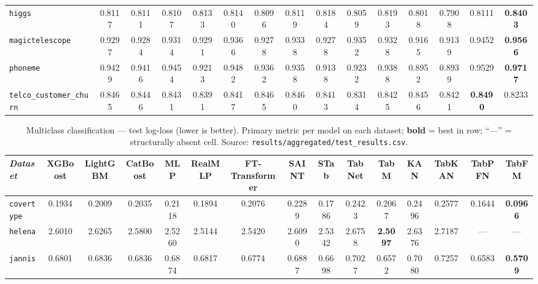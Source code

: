\begin{landscape}
\begin{table}[htbp]
\begin{tabular}{lcccccccccccccc}
\texttt{higgs} & 0.8117 & 0.8111 & 0.8107 & 0.8133 & 0.8140 & 0.8096 & 0.8119 & 0.8184 & 0.8059 & 0.8193 & 0.8018 & 0.7908 & 0.8111 & \textbf{0.8403} \\
\texttt{magictelescope} & 0.9297 & 0.9284 & 0.9314 & 0.9291 & 0.9366 & 0.9278 & 0.9338 & 0.9278 & 0.9352 & 0.9328 & 0.9165 & 0.9139 & 0.9452 & \textbf{0.9566} \\
\texttt{phoneme} & 0.9429 & 0.9416 & 0.9454 & 0.9213 & 0.9482 & 0.9362 & 0.9358 & 0.9138 & 0.9232 & 0.9388 & 0.8952 & 0.8939 & 0.9529 & \textbf{0.9717} \\
\texttt{telco\_\allowbreak customer\_\allowbreak churn} & 0.8465 & 0.8446 & 0.8431 & 0.8391 & 0.8417 & 0.8465 & 0.8460 & 0.8413 & 0.8314 & 0.8425 & 0.8456 & 0.8421 & \textbf{0.8490} & 0.8233 \\
\bottomrule
\end{tabular}
\end{table}

\begin{table}[htbp]
\centering
\scriptsize
\setlength{\tabcolsep}{3pt}
\caption[Multiclass classification --- complete results]{Multiclass classification --- test log-loss (lower is better). Primary metric per model on each dataset; \textbf{bold} = best in row; ``---'' = structurally absent cell. Source: \texttt{results/\allowbreak aggregated/\allowbreak test\_\allowbreak results.\allowbreak csv}.}
\label{tab:app-multiclasse}
\begin{tabular}{lcccccccccccccc}
\toprule
\emph{Dataset} & XGBoost & LightGBM & CatBoost & MLP & RealMLP & FT-Transformer & SAINT & STab & TabNet & TabM & KAN & TabKAN & TabPFN & TabFM \\
\midrule
\texttt{covertype} & 0.1934 & 0.2009 & 0.2035 & 0.2118 & 0.1894 & 0.2076 & 0.2289 & 0.1786 & 0.2423 & 0.2067 & 0.2496 & 0.2577 & 0.1644 & \textbf{0.0966} \\
\texttt{helena} & 2.6010 & 2.6265 & 2.5800 & 2.5260 & 2.5144 & 2.5420 & 2.6090 & 2.5342 & 2.6758 & \textbf{2.5097} & 2.6376 & 2.7187 & --- & --- \\
\texttt{jannis} & 0.6801 & 0.6836 & 0.6836 & 0.6874 & 0.6817 & 0.6774 & 0.6887 & 0.6698 & 0.7027 & 0.6572 & 0.7080 & 0.7257 & 0.6583 & \textbf{0.5709} \\
\bottomrule
\end{tabular}
\end{table}


\end{landscape}
